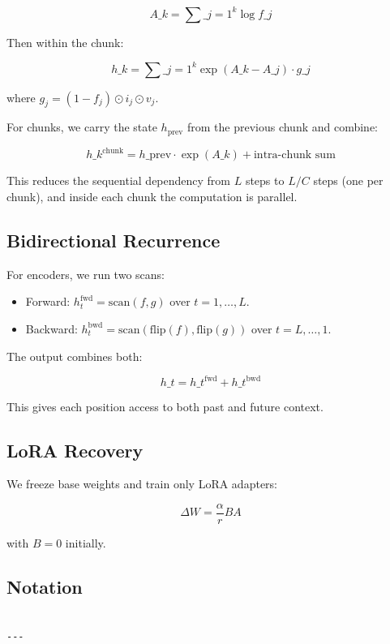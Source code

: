 \[
A\_k = \sum\_{j=1}^{k} \log f\_j
\tag{3.6}
\]

Then within the chunk:

\[
h\_k = \sum\_{j=1}^{k} \exp(A\_k - A\_j) \cdot g\_j
\tag{3.7}
\]

where $g_j = (1 - f_j) \odot i_j \odot v_j$.

For chunks, we carry the state $h_\text{prev}$ from the previous chunk and 
combine:

\[
h\_k^\text{chunk} = h\_\text{prev} \cdot \exp(A\_k) + \text{intra-chunk sum}
\tag{3.8}
\]

This reduces the sequential dependency from $L$ steps to $L / C$ steps 
(one per chunk), and inside each chunk the computation is parallel.

\subsection{Bidirectional Recurrence}

For encoders, we run two scans:

\begin{itemize}
\item Forward: $h_t^\text{fwd} = \text{scan}(f, g)$ over $t = 1, \ldots, L$.
\item Backward: $h_t^\text{bwd} = \text{scan}(\text{flip}(f), \text{flip}(g))$ over
  $t = L, \ldots, 1$.

\end{itemize}
The output combines both:

\[
h\_t = h\_t^\text{fwd} + h\_t^\text{bwd}
\tag{3.9}
\]

This gives each position access to both past and future context.

\subsection{LoRA Recovery}

We freeze base weights and train only LoRA adapters:

\[
\Delta W = \frac{\alpha}{r} B A
\tag{3.10}
\]

with $B = 0$ initially.

\subsection{Notation}

\begin{lstlisting}

---
\end{lstlisting}